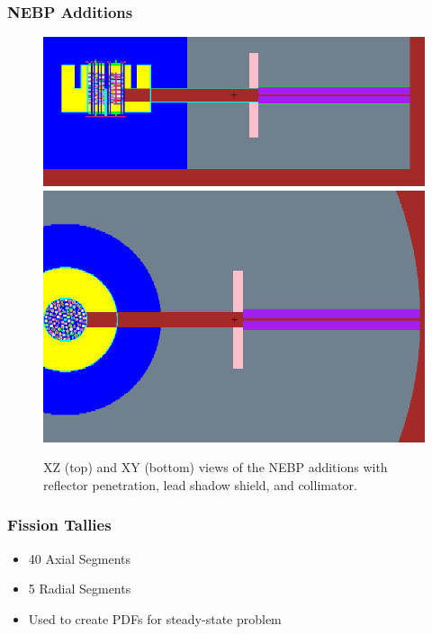 \documentclass[fleqn]{beamer}
\begin{document}
\begin{frame}
\frametitle{NEBP Additions}

\begin{figure}
\centering
\includegraphics[trim=0 40 0 20, clip, width = .9\textwidth]{mcnp_newxz}\\
\includegraphics[trim=0 120 0 120, clip, width = .9\textwidth]{mcnp_newxy}
\caption{XZ (top) and XY (bottom) views of the NEBP additions with reflector penetration, lead shadow shield, and collimator.}
\end{figure}

\end{frame}


\begin{frame}
\frametitle{Fission Tallies}

\begin{itemize}
\item 40 Axial Segments
\item  5 Radial Segments
\item Used to create PDFs for steady-state problem
\end{itemize}

\end{frame}
\end{document}
